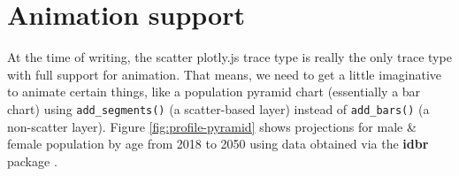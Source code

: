 \documentclass[
  12pt,
]{krantz}
\newenvironment{Shaded}{\begin{snugshade}}{\end{snugshade}}
\newcommand{\DataTypeTok}[1]{\textcolor[rgb]{0.13,0.29,0.53}{#1}}
\newcommand{\DecValTok}[1]{\textcolor[rgb]{0.00,0.00,0.81}{#1}}
\newcommand{\FloatTok}[1]{\textcolor[rgb]{0.00,0.00,0.81}{#1}}
\newcommand{\KeywordTok}[1]{\textcolor[rgb]{0.13,0.29,0.53}{\textbf{#1}}}
\newcommand{\NormalTok}[1]{#1}
\newcommand{\OperatorTok}[1]{\textcolor[rgb]{0.81,0.36,0.00}{\textbf{#1}}}
\newcommand{\StringTok}[1]{\textcolor[rgb]{0.31,0.60,0.02}{#1}}
\begin{document}
\hypertarget{animation-support}{%
\section{Animation support}\label{animation-support}}

At the time of writing, the scatter plotly.js trace type is really the only trace type with full support for animation. That means, we need to get a little imaginative to animate certain things, like a population pyramid chart (essentially a bar chart) using \texttt{add\_segments()} (a scatter-based layer) instead of \texttt{add\_bars()} (a non-scatter layer). Figure \ref{fig:profile-pyramid} shows projections for male \& female population by age from 2018 to 2050 using data obtained via the \textbf{idbr} package \citep{idbr}.

\begin{Shaded}
\end{Shaded}
\end{document}
